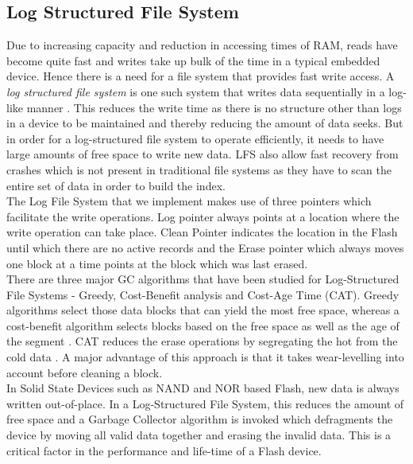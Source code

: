 \subsection{Log Structured File System}
	Due to increasing capacity and reduction in accessing times of RAM, reads have become quite fast and writes take up bulk of the time in a typical embedded device. Hence there is a need for a file system that provides fast write access. A \emph{log structured file system} is one such system that writes data sequentially in a log-like manner \cite{Rosenblum91}. This reduces the write time as there is no structure other than logs in a device to be maintained and thereby reducing the amount of data seeks. But in order for a log-structured file system to operate efficiently, it needs to have large amounts of free space to write new data. LFS also allow fast recovery from crashes which is not present in traditional file systems as they have to scan the entire set of data in order to build the index. \\

	The Log File System that we implement makes use of three pointers which facilitate the write operations. Log pointer always points at a location where the write operation can take place. Clean Pointer indicates the location in the Flash until which there are no active records and the Erase pointer which always moves one block at a time points at the block which was last erased. \\

	There are three major GC algorithms that have been studied for Log-Structured File Systems - Greedy, Cost-Benefit analysis and Cost-Age Time (CAT). Greedy algorithms select those data blocks that can yield the most free space, whereas a cost-benefit algorithm selects blocks based on the free space as well as the age of the segment \cite{Menon98, Kwon07}. CAT reduces the erase operations by segregating the hot from the cold data \cite{Chiang99}. A major advantage of this approach is that it takes wear-levelling into account before cleaning a block. \\

	In Solid State Devices such as NAND and NOR based Flash, new data is always written out-of-place. In a Log-Structured File System, this reduces the amount of free space and a Garbage Collector algorithm is invoked which defragments the device by moving all valid data together and erasing the invalid data. This is a critical factor in the performance and life-time of a Flash device. 
